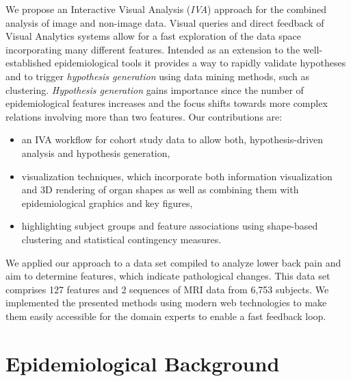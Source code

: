 \documentclass[journal]{style/vgtc} 			          %
\begin{document}
We propose an Interactive Visual Analysis (\emph{IVA}) approach \cite{Thomas2005} for the combined analysis of image and non-image data.
%
Visual queries and direct feedback of Visual Analytics systems allow for a fast exploration of the data space incorporating many different features.
%
Intended as an extension to the well-established epidemiological tools it provides a way to rapidly validate hypotheses and to trigger \emph{hypothesis generation} using data mining methods, such as clustering.
%
\emph{Hypothesis generation} gains importance since the number of epidemiological features increases and the focus shifts towards more complex relations involving more than two features. Our contributions are:
\begin{itemize} \itemsep0.1em
	\item an IVA workflow for cohort study data to allow both, hypothesis-driven analysis and hypothesis generation,%
	\item visualization techniques, which incorporate both information visualization and 3D rendering of organ shapes as well as combining them with epidemiological graphics and key figures,
	\item highlighting subject groups and feature associations using shape-based clustering and statistical contingency measures.
\end{itemize}
We applied our approach to a data set compiled to analyze lower back pain and aim to determine features, which indicate pathological changes.
%
This data set comprises 127 features and 2 sequences of MRI data from 6,753 subjects.
%
We implemented the presented methods using modern web technologies to make them easily accessible for the domain experts to enable a fast feedback loop.
%

\section{Epidemiological Background} \label{MedicalAndTechnicalBackground}
\end{document}
